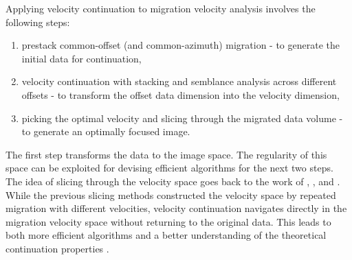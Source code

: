 \begin{comment}
theory \cite{GEO50.01.01100126}, continuation to a higher velocity
(left plot) corresponds to migration with a residual velocity, and its
impulse responses have an elliptical shape. Continuation to a smaller
velocity (right plot in Figure \ref{fig:fd-imp}) corresponds to
demigration (modeling), and its impulse responses have a hyperbolic
shape. The dispersion artifacts are clearly visible in the figure.
\par
In this paper, I explore the possibility of implementing a numerical
velocity continuation by spectral methods. I adopted two different
methods, comparable in efficiency with finite differences.  The first
method is a direct application of the Fast Fourier Transform (FFT)
technique.  The second method transforms the time grid to Chebyshev
collocation points, which leads to an application of the
Chebyshev-$\tau$ method \cite{lanc,orszag,boyd}, combined with an
unconditionally stable implicit advancement in velocity.  Both methods
employ a transformation of the grid from time $t$ to the squared time
$\sigma = t^2$, which removes the dependence on $t$ from the
coefficients of the velocity continuation equation. Additionally, the
Fourier transform in the space (midpoint) variable $x$ takes care of
the spatial dependencies. This transform is a major source of
efficiency, because different wavenumber slices can be processed
independently on a parallel computer before transforming them back to
the physical space.
\end{comment}
\par
Applying velocity continuation to migration velocity analysis involves
the following steps: 
\begin{enumerate}
\item prestack common-offset (and common-azimuth) migration - to
  generate the initial data for continuation,
\item velocity continuation with stacking and semblance analysis across
  different offsets - to transform the offset data dimension into the velocity
  dimension,
\item picking the optimal velocity and slicing through the migrated
  data volume - to generate an optimally focused image.
\end{enumerate}
The first step transforms the data to the image space. The regularity of this
space can be exploited for devising efficient algorithms for the next two
steps. The idea of slicing through the velocity space goes back to the work of
, , and
. While the previous slicing methods constructed
the velocity space by repeated migration with different velocities, velocity
continuation navigates directly in the migration velocity space without
returning to the original data. This leads to both more efficient algorithms
and a better understanding of the theoretical continuation properties
\cite{first}.

